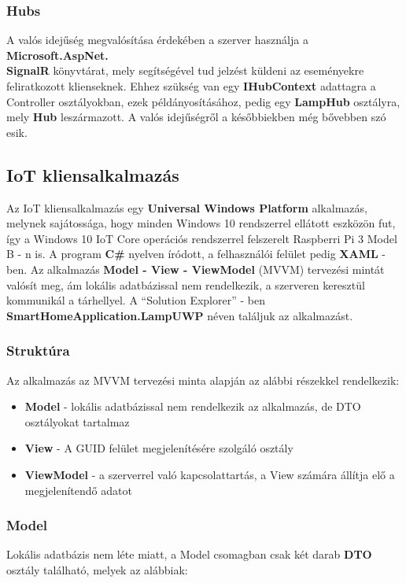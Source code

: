 \documentclass[a4paper,12pt]{report}
\begin{document}
    \subsubsection{Hubs}
    A valós idejűség megvalósítása érdekében a szerver használja a \textbf{Microsoft.AspNet.\\SignalR} könyvtárat, mely segítségével
    tud jelzést küldeni az eseményekre feliratkozott klienseknek. Ehhez szükség van egy \textbf{IHubContext} adattagra a Controller
    osztályokban, ezek példányosításához, pedig egy \textbf{LampHub} osztályra, mely \textbf{Hub} leszármazott. A valós idejűségről
    a későbbiekben még bővebben szó esik.

    \subsection{IoT kliensalkalmazás}
    Az IoT kliensalkalmazás egy \textbf{Universal Windows Platform} alkalmazás, melynek sajátossága, hogy minden Windows 10 rendszerrel
    ellátott eszközön fut, így a Windows 10 IoT Core operációs rendszerrel felszerelt Raspberri Pi 3 Model B - n is. A program \textbf{C\#} nyelven
    íródott, a felhasználói felület pedig \textbf{XAML} - ben. Az alkalmazás \textbf{Model - View - ViewModel} (MVVM) tervezési mintát
    valósít meg, ám lokális adatbázissal nem rendelkezik, a szerveren keresztül kommunikál a tárhellyel. A ``Solution Explorer'' - ben
    \textbf{SmartHomeApplication.LampUWP} néven találjuk az alkalmazást.

    \subsubsection{Struktúra}
    Az alkalmazás az MVVM tervezési minta alapján az alábbi részekkel rendelkezik:

    \begin{itemize}
        \item \textbf{Model} - lokális adatbázissal nem rendelkezik az alkalmazás, de DTO osztályokat tartalmaz
        \item \textbf{View} - A GUID felület megjelenítésére szolgáló osztály
        \item \textbf{ViewModel} - a szerverrel való kapcsolattartás, a View számára állítja elő a megjelenítendő adatot
    \end{itemize}

    \subsubsection{Model}
    Lokális adatbázis nem léte miatt, a Model csomagban csak két darab \textbf{DTO} osztály található, melyek az alábbiak:
\end{document}
